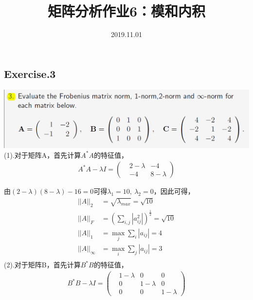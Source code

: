 \documentclass[UTF8,12pt, a4paper]{ctexart}
\title{矩阵分析作业6：模和内积}
\author{ 2019.11.01}
\date{}
\begin{document}
  \maketitle
  \pagestyle{plain}
  \allowdisplaybreaks

  \subsection*{Exercise.3}
  \includegraphics[scale=0.8]{question3.png} \\
  (1).对于矩阵A，首先计算$A^*A$的特征值，
  $$
  \begin{aligned}
    A^*A-\lambda I = 
    \left(
      \begin{matrix}
        &2-\lambda & -4 \\
        & -4 & 8-\lambda
      \end{matrix}
    \right)
  \end{aligned}
  $$

  由$(2-\lambda)(8-\lambda)-16=0$可得$\lambda_1=10,\ \lambda_2 = 0$，因此可得，
  $$
  \begin{aligned}
    ||A||_2 &= \sqrt{\lambda_{max}} = \sqrt{10} \\
    ||A||_F &= \left(\sum_{i,j}{|a_{ij}^2|}\right)^{\frac{1}{2}} = \sqrt{10}\\
    ||A||_1 &= \mathop{max} \limits_{j}\sum_{i}{|a_{ij}|} = 4 \\
    ||A||_{\infty} &= \mathop{max} \limits_{i}\sum_{j}{|a_{ij}|} = 3 \\
  \end{aligned}
  $$
  (2).对于矩阵B，首先计算$B^*B$的特征值，
  $$
  \begin{aligned}
    B^*B-\lambda I = 
    \left(
      \begin{matrix}
        &1-\lambda &0 &0 \\
        &0 & 1-\lambda &0 \\
        &0 &0 &1-\lambda
      \end{matrix}
    \right)
  \end{aligned}
  $$
\end{document}
